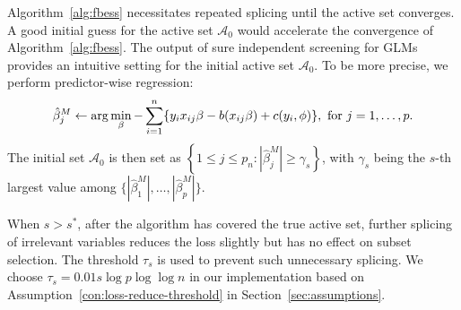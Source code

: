 \begin{remark}
Algorithm~\ref{alg:fbess} necessitates repeated splicing until the active set converges. A good initial guess for the active set $\mathcal{A}_0$ would accelerate the convergence of Algorithm~\ref{alg:fbess}.
The output of sure independent screening for GLMs \citep{jianqingfanSureIndependenceScreening2010} provides an intuitive setting for the initial active set $\mathcal{A}_0$.
To be more precise, we perform predictor-wise regression:
\begin{align*}
\hat{{\beta}}_j^M
\leftarrow
\arg\min_{\beta} - \sum_{i=1}^n\{y_i x_{ij}\beta - b(x_{ij}\beta) + c(y_i,\phi)\},
\textup{ for } j=1, \ldots, p.
\end{align*}
The initial set $\mathcal{A}_0$ is then set as $\left\{1 \leq j \leq p_{n}:|\hat{{\beta}}_{j}^{M}| \geq \gamma_{s} \right\}$,
with $\gamma_s$ being the $s$-th largest value among $\{ |\hat{{\beta}}_{1}^{M}|, \ldots, |\hat{{\beta}}_{p}^{M}| \}$.
\end{remark}
\begin{remark}
When $s > s^*$, after the algorithm has covered the true active set, further splicing of irrelevant variables reduces the loss slightly but has no effect on subset selection.
The threshold $\tau_s$ is used to prevent such unnecessary splicing. We choose $\tau_s = 0.01 s\log p\log\log n$ in our implementation based on Assumption~\ref{con:loss-reduce-threshold} in Section~\ref{sec:assumptions}.
\end{remark}

